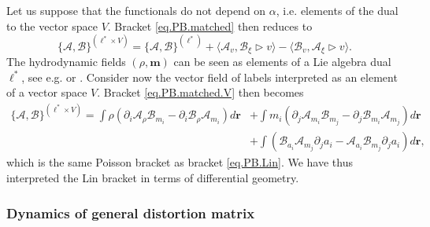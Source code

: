 \documentclass[twoside]{article}
\newcommand{\rr}{{\boldsymbol{r}}}
\newcommand{\mm}{{\boldsymbol{m}}}
\newcommand{\LAlg}{\ell}
\newcommand{\AF}{\mathscr{A}}
\newcommand{\BF}{\mathscr{B}}
\newcommand{\pd}{\partial}
\begin{document}
Let us suppose that the functionals do not depend on $\alpha$, i.e. elements of 
the dual to the vector space $V$. Bracket \eqref{eq.PB.matched} then reduces to 
\begin{equation}\label{eq.PB.matched.V}
\{\AF,\BF\}^{(\LAlg^* \times V)} = \{\AF,\BF\}^{(\LAlg^*)} +\langle \AF_v, 
\BF_\xi 
\rhd 
v\rangle-\langle \BF_v, \AF_\xi \rhd v\rangle.
\end{equation}
The hydrodynamic fields $(\rho,\mm)$ can be seen as elements of a Lie algebra 
dual $\LAlg^*$, see e.g. \cite{MaWe} or \cite{Pavelka2016}. Consider now the 
vector field of labels interpreted as an element of a vector space $V$. Bracket 
\eqref{eq.PB.matched.V} then becomes
\begin{align}\label{eq.PB.labels.geo}
\{\AF,\BF\}^{(\LAlg^* \times V)} = \int \rho\left(\pd_i \AF_\rho 
\BF_{m_i}-\pd_i 
\BF_\rho \AF_{m_i}\right)d\rr &+ \int m_i\left(\pd_j \AF_{m_i} \BF_{m_j}-\pd_j 
\BF_{m_i} 
\AF_{m_j}\right)d\rr \nonumber\\
&+\int  (\BF_{a_i} \AF_{m_j} \pd_j a_i -\AF_{a_i} \BF_{m_j} \pd_j a_i) d\rr,
\end{align}
which is the same Poisson bracket as bracket \eqref{eq.PB.Lin}. We have thus 
interpreted the Lin bracket in terms of differential geometry.


\subsubsection{Dynamics of general distortion matrix}\label{sec.general.A}
\end{document}
